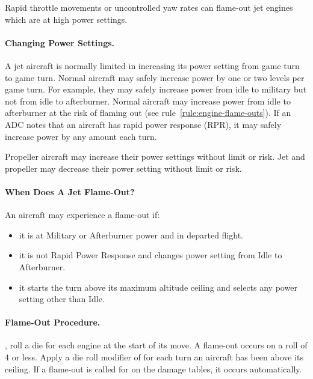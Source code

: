 \begin{advancedrules}
Rapid throttle movements or uncontrolled yaw rates can flame-out jet engines which are at high power settings.

\paragraph{Changing Power Settings.}\label{rule:rapid-power-response} A jet aircraft is normally limited in increasing its power setting from game turn to game turn. Normal aircraft may safely increase power by one or two levels per game turn. For example, they may safely increase power from idle to military but not from idle to afterburner. Normal aircraft may increase power from idle to afterburner at the risk of flaming out (see rule~\ref{rule:engine-flame-outs}). If an ADC notes that an aircraft has rapid power response (RPR), it may safely increase power by any amount each turn. 

Propeller aircraft may increase their power settings without limit or risk. Jet and propeller may decrease their power setting without limit or risk. 

\paragraph{When Does A Jet Flame-Out?} An aircraft may experience a flame-out if:

\begin{itemize}

    \item it is at Military or Afterburner power and in departed flight.

    \item it is not Rapid Power Response and changes power setting from Idle to Afterburner.

    \item it starts the turn above its maximum altitude ceiling and selects any power setting other than Idle.

\end{itemize}


\paragraph{Flame-Out Procedure.} 
, roll a die for each engine at the start of its move. A flame-out occurs on a roll of 4 or less. Apply a die roll modifier of  for each turn an aircraft has been above its ceiling. If a flame-out is called for on the damage tables, it occurs automatically.


\end{advancedrules}
